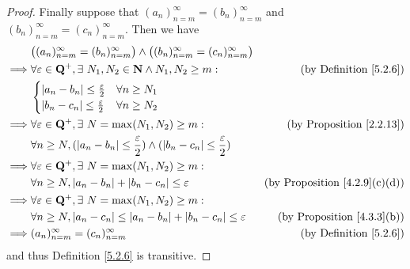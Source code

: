 \begin{proof}
    Finally suppose that \((a_n)_{n = m}^\infty = (b_n)_{n = m}^\infty\) and \((b_n)_{n = m}^\infty = (c_n)_{n = m}^\infty\).
    Then we have
    \begin{align*}
                 & \big((a_n)_{n = m}^\infty = (b_n)_{n = m}^\infty\big) \land \big((b_n)_{n = m}^\infty = (c_n)_{n = m}^\infty\big)                                               \\
        \implies & \forall \varepsilon \in \mathbf{Q}^+, \exists\ N_1, N_2 \in \mathbf{N} \land N_1, N_2 \geq m:                       & \text{(by Definition \ref{5.2.6})}        \\
                 & \begin{cases}
                       \abs*{a_n - b_n} \leq \frac{\varepsilon}{2} & \forall n \geq N_1 \\
                       \abs*{b_n - c_n} \leq \frac{\varepsilon}{2} & \forall n \geq N_2 \\
                   \end{cases}                                                                                                \\
        \implies & \forall \varepsilon \in \mathbf{Q}^+, \exists\ N = \max(N_1, N_2) \geq m:                                           & \text{(by Proposition \ref{2.2.13})}      \\
                 & \forall n \geq N, (\abs*{a_n - b_n} \leq \frac{\varepsilon}{2}) \land (\abs*{b_n - c_n} \leq \frac{\varepsilon}{2})                                             \\
        \implies & \forall \varepsilon \in \mathbf{Q}^+, \exists\ N = \max(N_1, N_2) \geq m:                                                                                       \\
                 & \forall n \geq N, \abs*{a_n - b_n} + \abs*{b_n - c_n} \leq \varepsilon                                              & \text{(by Proposition \ref{4.2.9}(c)(d))} \\
        \implies & \forall \varepsilon \in \mathbf{Q}^+, \exists\ N = \max(N_1, N_2) \geq m:                                                                                       \\
                 & \forall n \geq N, \abs*{a_n - c_n} \leq \abs*{a_n - b_n} + \abs*{b_n - c_n} \leq \varepsilon                        & \text{(by Proposition \ref{4.3.3}(b))}    \\
        \implies & (a_n)_{n = m}^\infty = (c_n)_{n = m}^\infty                                                                         & \text{(by Definition \ref{5.2.6})}
    \end{align*}
    and thus Definition \ref{5.2.6} is transitive.
\end{proof}

